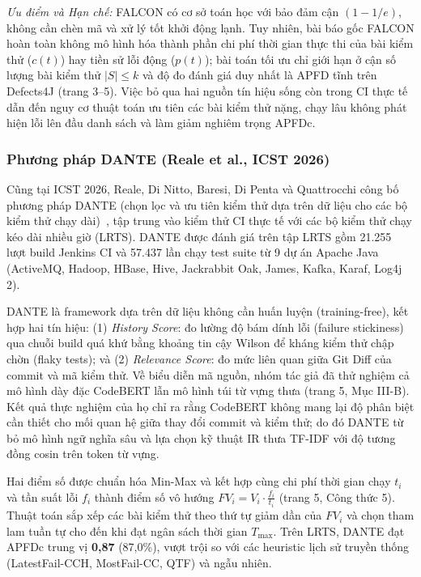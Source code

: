 \textit{Ưu điểm và Hạn chế:} FALCON có cơ sở toán học với bảo đảm cận $(1 - 1/e)$, không cần chèn mã và xử lý tốt khởi động lạnh. Tuy nhiên, bài báo gốc FALCON hoàn toàn không mô hình hóa thành phần chi phí thời gian thực thi của bài kiểm thử ($c(t)$) hay tiền sử lỗi động ($p(t)$); bài toán tối ưu chỉ giới hạn ở cận số lượng bài kiểm thử $|S| \le k$ và độ đo đánh giá duy nhất là APFD tĩnh trên Defects4J (trang 3--5). Việc bỏ qua hai nguồn tín hiệu sống còn trong CI thực tế dẫn đến nguy cơ thuật toán ưu tiên các bài kiểm thử nặng, chạy lâu không phát hiện lỗi lên đầu danh sách và làm giảm nghiêm trọng APFDc.

\subsubsection{Phương pháp DANTE (Reale et al., ICST 2026)}
\label{subsubsec:dante_method}

Cũng tại ICST 2026, Reale, Di Nitto, Baresi, Di Penta và Quattrocchi công bố phương pháp DANTE (chọn lọc và ưu tiên kiểm thử dựa trên dữ liệu cho các bộ kiểm thử chạy dài)~\cite{dante2026}, tập trung vào kiểm thử CI thực tế với các bộ kiểm thử chạy kéo dài nhiều giờ (LRTS).
DANTE được đánh giá trên tập LRTS gồm 21.255 lượt build Jenkins CI và 57.437 lần chạy test suite từ 9 dự án Apache Java (ActiveMQ, Hadoop, HBase, Hive, Jackrabbit Oak, James, Kafka, Karaf, Log4j 2).

DANTE là framework dựa trên dữ liệu không cần huấn luyện (training-free), kết hợp hai tín hiệu: (1) \textit{History Score}: đo lường độ bám dính lỗi (failure stickiness) qua chuỗi build quá khứ bằng khoảng tin cậy Wilson để kháng kiểm thử chập chờn (flaky tests); và (2) \textit{Relevance Score}: đo mức liên quan giữa Git Diff của commit và mã kiểm thử. Về biểu diễn mã nguồn, nhóm tác giả đã thử nghiệm cả mô hình dày đặc CodeBERT lẫn mô hình túi từ vựng thưa (trang 5, Mục III-B). Kết quả thực nghiệm của họ chỉ ra rằng CodeBERT không mang lại độ phân biệt cần thiết cho mối quan hệ giữa thay đổi commit và kiểm thử; do đó DANTE từ bỏ mô hình ngữ nghĩa sâu và lựa chọn kỹ thuật IR thưa TF-IDF với độ tương đồng cosin trên token từ vựng.

Hai điểm số được chuẩn hóa Min-Max và kết hợp cùng chi phí thời gian chạy $t_i$ và tần suất lỗi $f_i$ thành điểm số vô hướng $FV_i = V_i \cdot \frac{f_i}{t_i}$ (trang 5, Công thức 5). Thuật toán sắp xếp các bài kiểm thử theo thứ tự giảm dần của $FV_i$ và chọn tham lam tuần tự cho đến khi đạt ngân sách thời gian $T_{\max}$. Trên LRTS, DANTE đạt APFDc trung vị \textbf{0,87} (87,0\%), vượt trội so với các heuristic lịch sử truyền thống (LatestFail-CCH, MostFail-CC, QTF) và ngẫu nhiên.

